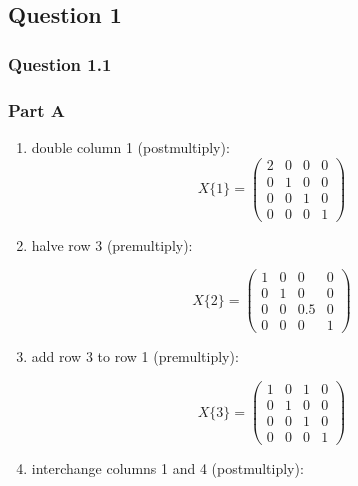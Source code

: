 \subsection{Question 1}

\subsubsection{Question 1.1}
\subsubsection{Part A}

\begin{enumerate}

\item double column 1 (postmultiply):
  \begin{equation}
    X\{1\} = 
    \begin{pmatrix}
      2 & 0 & 0 & 0 \\
      0 & 1 & 0 & 0 \\
      0 & 0 & 1 & 0 \\
      0 & 0 & 0 & 1
    \end{pmatrix}
  \end{equation}

\item halve row 3 (premultiply):

  \begin{equation}
    X\{2\} = 
    \begin{pmatrix}
      1 & 0 & 0 & 0 \\
      0 & 1 & 0 & 0 \\
      0 & 0 & 0.5 & 0 \\
      0 & 0 & 0 & 1
    \end{pmatrix}
  \end{equation}

\item add row 3 to row 1 (premultiply):

  \begin{equation}
    X\{3\} = 
    \begin{pmatrix}
      1 & 0 & 1 & 0 \\
      0 & 1 & 0 & 0 \\
      0 & 0 & 1 & 0 \\
      0 & 0 & 0 & 1
    \end{pmatrix}
  \end{equation}

\item interchange columns 1 and 4 (postmultiply):


\end{enumerate}
